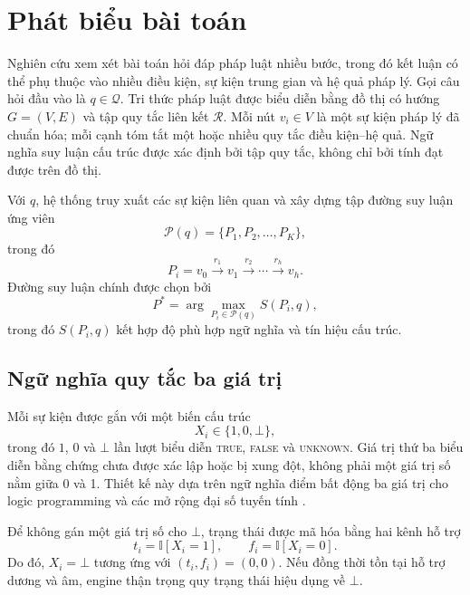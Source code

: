 \section{Phát biểu bài toán}
\label{sec:problem_formulation}

Nghiên cứu xem xét bài toán hỏi đáp pháp luật nhiều bước, trong đó kết luận có
thể phụ thuộc vào nhiều điều kiện, sự kiện trung gian và hệ quả pháp lý. Gọi
câu hỏi đầu vào là $q\in\mathcal{Q}$. Tri thức pháp luật được biểu diễn bằng đồ
thị có hướng $G=(V,E)$ và tập quy tắc liên kết $\mathcal{R}$. Mỗi nút
$v_i\in V$ là một sự kiện pháp lý đã chuẩn hóa; mỗi cạnh tóm tắt một hoặc nhiều
quy tắc điều kiện--hệ quả. Ngữ nghĩa suy luận cấu trúc được xác định bởi tập quy
tắc, không chỉ bởi tính đạt được trên đồ thị.

Với $q$, hệ thống truy xuất các sự kiện liên quan và xây dựng tập đường suy
luận ứng viên
\begin{equation}
\mathcal{P}(q)=\{P_1,P_2,\ldots,P_K\},
\end{equation}
trong đó
\begin{equation}
P_i=v_0\xrightarrow{r_1}v_1\xrightarrow{r_2}\cdots
\xrightarrow{r_h}v_h.
\end{equation}
Đường suy luận chính được chọn bởi
\begin{equation}
P^*=\arg\max_{P_i\in\mathcal{P}(q)}S(P_i,q),
\end{equation}
trong đó $S(P_i,q)$ kết hợp độ phù hợp ngữ nghĩa và tín hiệu cấu trúc.

\subsection{Ngữ nghĩa quy tắc ba giá trị}

Mỗi sự kiện được gắn với một biến cấu trúc
\begin{equation}
X_i\in\{1,0,\bot\},
\end{equation}
trong đó $1$, $0$ và $\bot$ lần lượt biểu diễn \textsc{true},
\textsc{false} và \textsc{unknown}. Giá trị thứ ba biểu diễn bằng chứng chưa
được xác lập hoặc bị xung đột, không phải một giá trị số nằm giữa 0 và 1. Thiết
kế này dựa trên ngữ nghĩa điểm bất động ba giá trị cho logic programming
\cite{kleene1952metamathematics,fitting1985kripke} và các mở rộng đại số tuyến
tính \cite{sato2020threevalued}.

Để không gán một giá trị số cho $\bot$, trạng thái được mã hóa bằng hai kênh hỗ
trợ
\begin{equation}
t_i=\mathbb{I}[X_i=1],\qquad
f_i=\mathbb{I}[X_i=0].
\label{eq:two_channel_state}
\end{equation}
Do đó, $X_i=\bot$ tương ứng với $(t_i,f_i)=(0,0)$. Nếu đồng thời tồn tại hỗ
trợ dương và âm, engine thận trọng quy trạng thái hiệu dụng về $\bot$.

